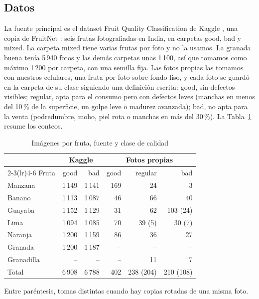 \documentclass[conference]{IEEEtran}
\begin{document}
\subsection{Datos}
La fuente principal es el dataset Fruit Quality Classification de Kaggle \cite{park2024}, una copia de FruitNet \cite{meshram2022}: seis frutas fotografiadas en India, en carpetas good, bad y mixed. La carpeta mixed tiene varias frutas por foto y no la usamos. La granada buena tenía 5\,940 fotos y las demás carpetas unas 1\,100, así que tomamos como máximo 1\,200 por carpeta, con una semilla fija. Las fotos propias las tomamos con nuestros celulares, una fruta por foto sobre fondo liso, y cada foto se guardó en la carpeta de su clase siguiendo una definición escrita: good, sin defectos visibles; regular, apta para el consumo pero con defectos leves (manchas en menos del 10\,\% de la superficie, un golpe leve o madurez avanzada); bad, no apta para la venta (podredumbre, moho, piel rota o manchas en más del 30\,\%). La Tabla~\ref{tab:datos} resume los conteos.

\begin{table}[t]
\caption{Imágenes por fruta, fuente y clase de calidad}
\label{tab:datos}
\centering
\footnotesize
\setlength{\tabcolsep}{4pt}
\begin{tabular*}{\columnwidth}{@{\extracolsep{\fill}}lrrrrr}
\toprule
 & \multicolumn{2}{c}{Kaggle} & \multicolumn{3}{c}{Fotos propias} \\
\cmidrule(lr){2-3}\cmidrule(lr){4-6}
Fruta & good & bad & good & regular & bad \\
\midrule
Manzana & 1\,149 & 1\,141 & 169 & 24 & 3 \\
Banano & 1\,113 & 1\,087 & 46 & 66 & 40 \\
Guayaba & 1\,152 & 1\,129 & 31 & 62 & 103 (24) \\
Lima & 1\,094 & 1\,085 & 70 & 39 (5) & 30 (7) \\
Naranja & 1\,200 & 1\,159 & 86 & 36 & 27 \\
Granada & 1\,200 & 1\,187 & -- & -- & -- \\
Granadilla & -- & -- & -- & 11 & 7 \\
\midrule
Total & 6\,908 & 6\,788 & 402 & 238 (204) & 210 (108) \\
\bottomrule
\end{tabular*}
\par\smallskip
\parbox{\columnwidth}{\scriptsize Entre paréntesis, tomas distintas cuando hay copias rotadas de una misma foto.}
\end{table}
\end{document}

